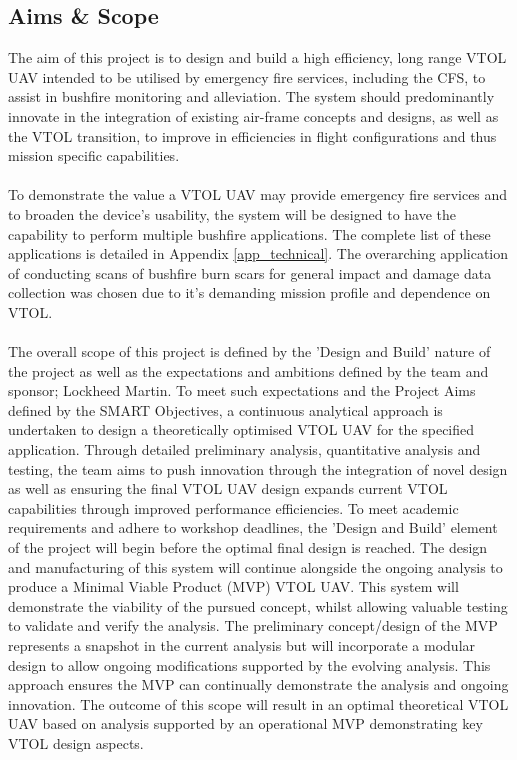 \subsection{Aims \& Scope}
The aim of this project is to design and build a high efficiency, long range VTOL UAV intended to be utilised by emergency fire services, including the CFS, to assist in bushfire monitoring and alleviation. The system should predominantly innovate in the integration of existing air-frame concepts and designs, as well as the VTOL transition, to improve in efficiencies in flight configurations and thus mission specific capabilities.\\ 
\\
To demonstrate the value a VTOL UAV may provide emergency fire services and to broaden the device’s usability, the system will be designed to have the capability to perform multiple bushfire applications. The complete list of these applications is detailed in Appendix \ref{app_technical}. The overarching application of conducting scans of bushfire burn scars for general impact and damage data collection was chosen due to it's demanding mission profile and dependence on VTOL. \\
\\
The overall scope of this project is defined by the 'Design and Build' nature of the project as well as the expectations and ambitions defined by the team and sponsor; Lockheed Martin. To meet such expectations and the Project Aims defined by the SMART Objectives, a continuous analytical approach is undertaken to design a theoretically optimised VTOL UAV for the specified application. Through detailed preliminary analysis, quantitative analysis and testing, the team aims to push innovation through the integration of novel design as well as ensuring the final VTOL UAV design expands current VTOL capabilities through improved performance efficiencies. To meet academic requirements and adhere to workshop deadlines, the 'Design and Build' element of the project will begin before the optimal final design is reached. The design and manufacturing of this system will continue alongside the ongoing analysis to produce a Minimal Viable Product (MVP) VTOL UAV. This system will demonstrate the viability of the pursued concept, whilst allowing valuable testing to validate and verify the analysis. The preliminary concept/design of the MVP represents a snapshot in the current analysis but will incorporate a modular design to allow ongoing modifications supported by the evolving analysis. This approach ensures the MVP can continually demonstrate the analysis and ongoing innovation. The outcome of this scope will result in an optimal theoretical VTOL UAV based on analysis supported by an operational MVP demonstrating key VTOL design aspects. 

